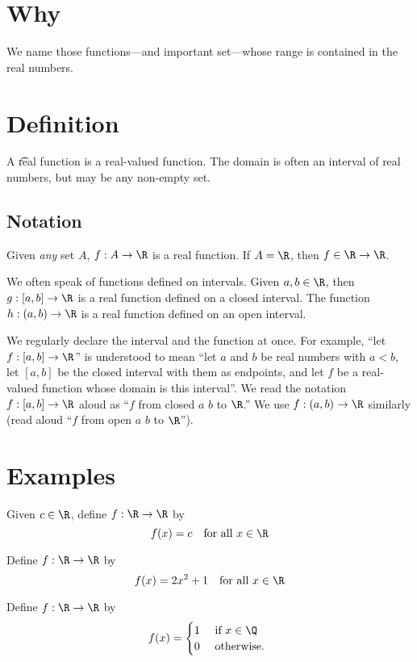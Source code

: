 
\section*{Why}

We name those functions---and important set---whose range is contained in the real numbers.

\section*{Definition}

A \t{real function} is a real-valued function.
The domain is often an interval of real numbers, but may be any non-empty set.

\subsection*{Notation}

Given \textit{any} set $A$, $f: A \to \R $ is a real function.
If $A = \R $, then $f \in \R  \to \R $.

We often speak of functions defined on intervals.
Given $a, b \in \R $, then $g: [a, b] \to \R $ is a real function defined on a closed interval.
The function $h: (a, b) \to \R $ is a real function defined on an open interval.

We regularly declare the interval and the function at once.
For example, ``let $f: [a, b] \to \R $'' is understood to mean ``let $a$ and $b$ be real numbers with $a < b$, let $[a, b]$ be the closed interval with them as endpoints, and let $f$ be a real-valued function whose domain is this interval''.
We read the notation $f: [a, b] \to \R $ aloud as ``$f$ from closed $a$ $b$ to $\R $.''
We use $f: (a, b) \to \R $ similarly (read aloud ``$f$ from open $a$ $b$ to $\R $'').

\section*{Examples}

\begin{example}
Given $c \in \R $, define $f: \R  \to \R $ by
\[
f(x) = c \quad \text{for all } x \in \R
\]
\end{example}

\begin{example}
Define $f: \R  \to \R $ by
\[
f(x) = 2x^2 + 1 \quad \text{for all } x \in \R
\]
\end{example}

\begin{example}
Define $f: \R  \to \R $ by
\[
f(x) = \begin{cases}
1 & \text{ if } x \in \Q  \\
0 & \text{ otherwise. }
\end{cases}
\]
\end{example}
